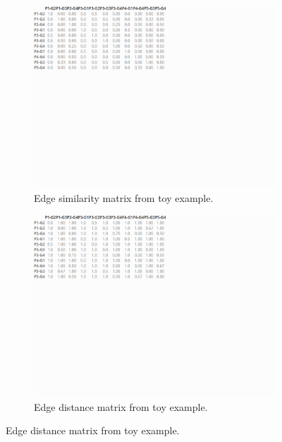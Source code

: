 \documentclass[a4paper,12pt]{extarticle}
\begin{document}
\begin{figure}
    \captionsetup[subfigure]{font=footnotesize,labelfont=footnotesize}
    \centering
     \begin{subfigure}[b]{0.4\textwidth}
        \includegraphics[width=1.0\textwidth, trim={0 12cm 12cm 0},clip]{Toy/toy-sim.png}
        \caption{Edge similarity matrix from toy example.}
        \label{tab:toy-sim}
    \end{subfigure}
     \begin{subfigure}[b]{0.4\textwidth}
        \includegraphics[width=1.0\textwidth, trim={0 12cm 12cm 0},clip]{Toy/toy-dis.png}
        \caption{Edge distance matrix from toy example.}
        \label{tab:toy-dis}

\end{subfigure}
\end{figure}
\end{document}
